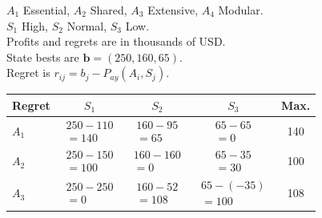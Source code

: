 {\noindent\begin{minipage}[t]{0.46\textwidth}
  \vspace{0pt}
  $A_1$ Essential, $A_2$ Shared, $A_3$ Extensive, $A_4$ Modular.\\
  $S_1$ High, $S_2$ Normal, $S_3$ Low.\\
  Profits and regrets are in thousands of USD.\\
  State bests are $\boldsymbol{b}=(250,160,65)$.\\
  Regret is $r_{ij}=b_j-P_{ay}(A_i,S_j)$.
\end{minipage}\hfill
\begin{minipage}[t]{0.51\textwidth}
  \vspace{0pt}\centering
  \setlength{\tabcolsep}{3pt}
  \renewcommand{\arraystretch}{1.2}
  \begin{tabular}{@{}lcccc@{}}
    \toprule
    Regret & $S_1$ & $S_2$ & $S_3$ & Max.\\ \midrule
    $A_1$ & $\begin{gathered}250-110\\=140\end{gathered}$ & $\begin{gathered}160-95\\=65\end{gathered}$ & $\begin{gathered}65-65\\=0\end{gathered}$ & 140\\
    $A_2$ & $\begin{gathered}250-150\\=100\end{gathered}$ & $\begin{gathered}160-160\\=0\end{gathered}$ & $\begin{gathered}65-35\\=30\end{gathered}$ & 100\\
    $A_3$ & $\begin{gathered}250-250\\=0\end{gathered}$ & $\begin{gathered}160-52\\=108\end{gathered}$ & $\begin{gathered}65-(-35)\\=100\end{gathered}$ & 108\\

\end{tabular}
\end{minipage}}
